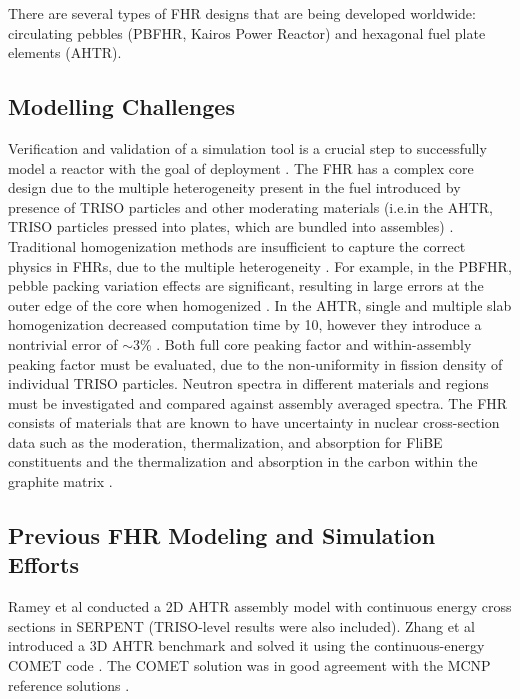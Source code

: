 There are several types of \gls{FHR} designs that are being developed worldwide: 
circulating pebbles (\gls{PBFHR}, Kairos Power Reactor) and hexagonal fuel plate elements (\gls{AHTR}). 


\subsection{Modelling Challenges}
Verification and validation of a simulation tool is a crucial step to successfully 
model a reactor with the goal of deployment \cite{rahnema_phenomena_2019}. 
The \gls{FHR} has a complex core design due to the multiple heterogeneity present 
in the fuel introduced by presence of \gls{TRISO} particles and other moderating 
materials (i.e.in the \gls{AHTR}, \gls{TRISO} particles pressed into plates, which 
are bundled into assembles) \cite{ramey_monte_2018,rahnema_phenomena_2019}.
Traditional homogenization methods are insufficient to capture the correct physics 
in \glspl{FHR}, due to the multiple heterogeneity \cite{ramey_monte_2018}. 
For example, in the \gls{PBFHR}, pebble packing variation effects are significant, 
resulting in large errors at the outer edge of the core when homogenized 
\cite{rahnema_phenomena_2019}. 
In the \gls{AHTR}, single and multiple slab homogenization decreased computation time 
by 10, however they introduce a nontrivial error of $\sim$3\%
\cite{ramey_monte_2018,cisneros_neutronics_2012}.
Both full core peaking factor and within-assembly peaking factor must be evaluated, 
due to the non-uniformity in fission density of individual \gls{TRISO} particles. 
Neutron spectra in different materials and regions must be investigated and compared 
against assembly averaged spectra. 
The \gls{FHR} consists of materials that are known to have uncertainty 
in nuclear cross-section data such as the moderation, thermalization, and absorption 
for FliBE constituents and the thermalization and absorption 
in the carbon within the graphite matrix \cite{rahnema_phenomena_2019}. 
 
\subsection{Previous \gls{FHR} Modeling and Simulation Efforts}
Ramey et al \cite{ramey_monte_2018} conducted a 2D \gls{AHTR} assembly model with 
continuous energy cross sections in SERPENT (\gls{TRISO}-level results were also 
included). 
Zhang et al introduced a 3D \gls{AHTR} benchmark \cite{zhang_stylized_2018}
and solved it using the continuous-energy COMET code 
\cite{zhang_continuous-energy_2018}. 
The COMET solution was in good agreement with the \gls{MCNP} reference solutions
\cite{zhang_continuous-energy_2018}. 



